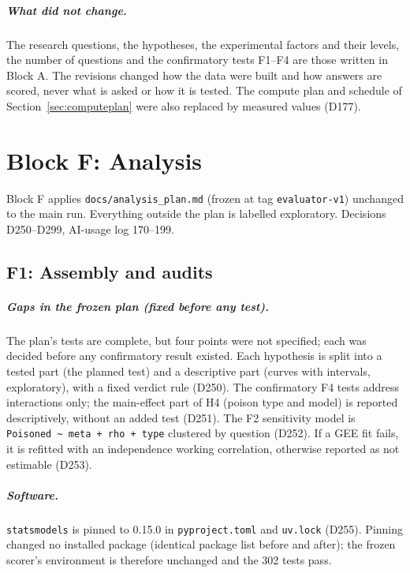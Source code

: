 \documentclass[11pt,a4paper]{report}
\begin{document}
\paragraph{What did not change.}
The research questions, the hypotheses, the experimental factors and their
levels, the number of questions and the confirmatory tests F1--F4 are those
written in Block A. The revisions changed how the data were built and how
answers are scored, never what is asked or how it is tested. The compute plan
and schedule of Section~\ref{sec:computeplan} were also replaced by measured
values (D177).

\chapter{Block F: Analysis}\label{ch:blockF}

Block F applies \texttt{docs/analysis\_plan.md} (frozen at tag \texttt{evaluator-v1}) unchanged to the
main run. Everything outside the plan is labelled exploratory. Decisions D250--D299, AI-usage log 170--199.

\section{F1: Assembly and audits}

\paragraph{Gaps in the frozen plan (fixed before any test).} The plan's tests are complete, but four
points were not specified; each was decided before any confirmatory result existed. Each hypothesis is
split into a tested part (the planned test) and a descriptive part (curves with intervals, exploratory),
with a fixed verdict rule (D250). The confirmatory F4 tests address interactions only; the main-effect
part of H4 (poison type and model) is reported descriptively, without an added test (D251). The F2
sensitivity model is \texttt{Poisoned \textasciitilde{} meta + rho + type} clustered by question (D252).
If a GEE fit fails, it is refitted with an independence working correlation, otherwise reported as not
estimable (D253).

\paragraph{Software.} \texttt{statsmodels} is pinned to 0.15.0 in \texttt{pyproject.toml} and
\texttt{uv.lock} (D255). Pinning changed no installed package (identical package list before and after);
the frozen scorer's environment is therefore unchanged and the 302 tests pass.
\end{document}
